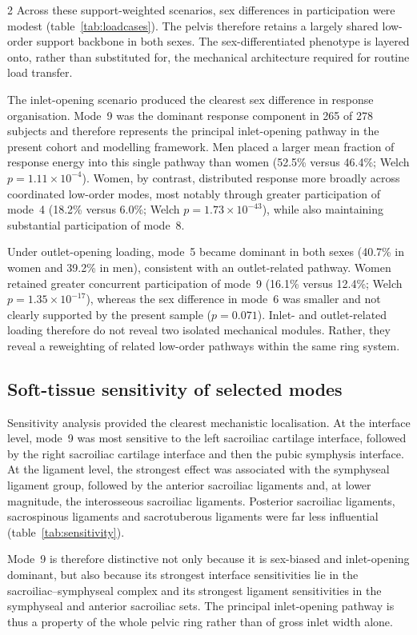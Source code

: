\documentclass[openacc]{rsproca_new}
\begin{document}
\begin{multicols}{2}
Across these support-weighted scenarios, sex differences in participation were modest (table~\ref{tab:loadcases}). The pelvis therefore retains a largely shared low-order support backbone in both sexes. The sex-differentiated phenotype is layered onto, rather than substituted for, the mechanical architecture required for routine load transfer.

The inlet-opening scenario produced the clearest sex difference in response organisation. Mode~9 was the dominant response component in 265 of 278 subjects and therefore represents the principal inlet-opening pathway in the present cohort and modelling framework. Men placed a larger mean fraction of response energy into this single pathway than women (52.5\% versus 46.4\%; Welch $p=1.11\times10^{-4}$). Women, by contrast, distributed response more broadly across coordinated low-order modes, most notably through greater participation of mode~4 (18.2\% versus 6.0\%; Welch $p=1.73\times10^{-43}$), while also maintaining substantial participation of mode~8.

Under outlet-opening loading, mode~5 became dominant in both sexes (40.7\% in women and 39.2\% in men), consistent with an outlet-related pathway. Women retained greater concurrent participation of mode~9 (16.1\% versus 12.4\%; Welch $p=1.35\times10^{-17}$), whereas the sex difference in mode~6 was smaller and not clearly supported by the present sample ($p=0.071$). Inlet- and outlet-related loading therefore do not reveal two isolated mechanical modules. Rather, they reveal a reweighting of related low-order pathways within the same ring system.

\subsection{Soft-tissue sensitivity of selected modes}

Sensitivity analysis provided the clearest mechanistic localisation. At the interface level, mode~9 was most sensitive to the left sacroiliac cartilage interface, followed by the right sacroiliac cartilage interface and then the pubic symphysis interface. At the ligament level, the strongest effect was associated with the symphyseal ligament group, followed by the anterior sacroiliac ligaments and, at lower magnitude, the interosseous sacroiliac ligaments. Posterior sacroiliac ligaments, sacrospinous ligaments and sacrotuberous ligaments were far less influential (table~\ref{tab:sensitivity}).

Mode~9 is therefore distinctive not only because it is sex-biased and inlet-opening dominant, but also because its strongest interface sensitivities lie in the sacroiliac--symphyseal complex and its strongest ligament sensitivities in the symphyseal and anterior sacroiliac sets. The principal inlet-opening pathway is thus a property of the whole pelvic ring rather than of gross inlet width alone.


\end{multicols}
\end{document}
